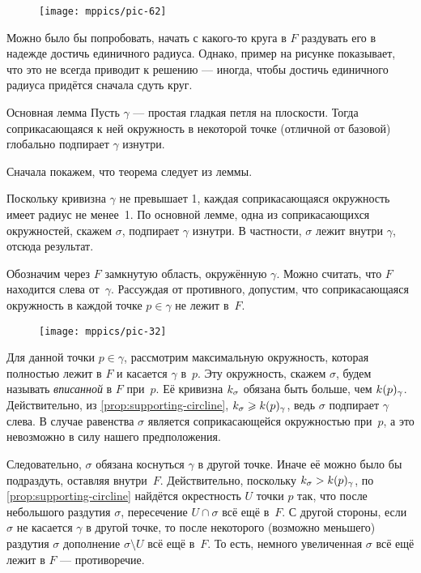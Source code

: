 {

\begin{wrapfigure}{r}{33 mm}
\vskip-0mm
\centering
\texttt{[image: mppics/pic-62]}
\vskip0mm
\end{wrapfigure}

Можно было бы попробовать, начать с какого-то круга в $F$ раздувать его в надежде достичь единичного радиуса.
Однако, пример на рисунке показывает, что это не всегда приводит к решению --- 
иногда, чтобы достичь единичного радиуса придётся сначала сдуть круг.

\begin{thm}{Основная лемма}\label{thm:moon}
Пусть $\gamma$ --- простая гладкая петля на плоскости.
Тогда соприкасающаяся к ней окружность в некоторой точке (отличной от базовой) глобально подпирает $\gamma$ изнутри.
\end{thm}

}

Сначала покажем, что теорема следует из леммы.

Поскольку кривизна $\gamma$ не превышает 1, каждая соприкасающаяся окружность имеет радиус не менее~1.
По основной лемме, одна из соприкасающихся окружностей, скажем $\sigma$, подпирает $\gamma$ изнутри.
В частности, $\sigma$ лежит внутри $\gamma$, отсюда результат.
\qeds


Обозначим через $F$ замкнутую область, окружённую $\gamma$.
Можно считать, что $F$ находится слева от~$\gamma$.
Рассуждая от противного, допустим, что соприкасающаяся окружность в каждой точке $p\in \gamma$ не лежит в~$F$.

\begin{figure}[!ht]
\vskip-0mm
\centering
\texttt{[image: mppics/pic-32]}
\vskip-2mm
\end{figure}

Для данной точки $p\in\gamma$, рассмотрим максимальную окружность, которая полностью лежит в $F$ и касается $\gamma$ в~$p$.
Эту окружность, скажем $\sigma$, будем называть {}\emph{вписанной} в $F$ при~$p$.
Её кривизна $k_\sigma$ обязана быть больше, чем $k(p)_\gamma$.
Действительно, из \ref{prop:supporting-circline}, $k_\sigma\geqslant k(p)_\gamma$, ведь $\sigma$ подпирает $\gamma$ слева.
В случае равенства $\sigma$ является соприкасающейся окружностью при~$p$,
а это невозможно в силу нашего предположения.

Следовательно, $\sigma$ обязана коснуться $\gamma$ в другой точке.
Иначе её можно было бы подраздуть, оставляя внутри~$F$.
Действительно, поскольку $k_\sigma> k(p)_\gamma$, 
по \ref{prop:supporting-circline} найдётся окрестность $U$ точки $p$ так, что после небольшого раздутия $\sigma$, пересечение $U\cap \sigma$ всё ещё в~$F$.
С другой стороны, если $\sigma$ не касается $\gamma$ в другой точке, то после некоторого (возможно меньшего) раздутия $\sigma$ дополнение $\sigma\setminus U$ всё ещё в~$F$.
То есть, немного увеличенная $\sigma$ всё ещё лежит в $F$ --- противоречие.

